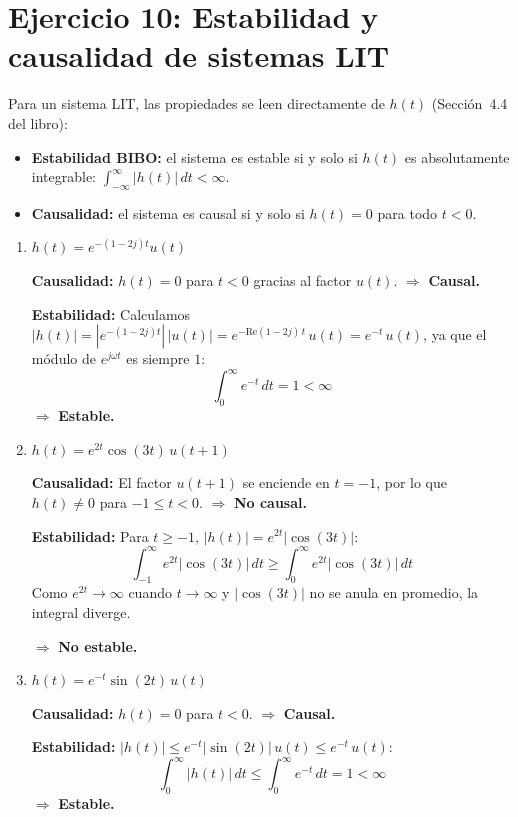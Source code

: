 \documentclass[10pt,a4paper]{article}
\begin{document}
	\section*{Ejercicio 10: Estabilidad y causalidad de sistemas LIT}
	
	Para un sistema LIT, las propiedades se leen directamente de $h(t)$ (Sección~4.4 del libro):
	\begin{itemize}
		\item \textbf{Estabilidad BIBO:} el sistema es estable si y solo si $h(t)$ es absolutamente integrable: $\int_{-\infty}^{\infty}|h(t)|\,dt < \infty$.
		\item \textbf{Causalidad:} el sistema es causal si y solo si $h(t) = 0$ para todo $t < 0$.
	\end{itemize}
	
	\begin{enumerate}[label=\textbf{\alph*)}]
		\item $h(t) = e^{-(1-2j)t}u(t)$
		
		\textbf{Causalidad:} $h(t) = 0$ para $t<0$ gracias al factor $u(t)$. $\Rightarrow$ \textbf{Causal.}
		
		\textbf{Estabilidad:} Calculamos $|h(t)| = |e^{-(1-2j)t}|\,|u(t)| = e^{-\text{Re}(1-2j)\,t}\,u(t) = e^{-t}\,u(t)$, ya que el módulo de $e^{j\omega t}$ es siempre $1$:
		\[
		\int_0^{\infty} e^{-t}\,dt = 1 < \infty
		\]
		$\Rightarrow$ \textbf{Estable.}
		
		\item $h(t) = e^{2t}\cos(3t)\,u(t+1)$
		
		\textbf{Causalidad:} El factor $u(t+1)$ se enciende en $t = -1$, por lo que $h(t) \neq 0$ para $-1 \leq t < 0$. $\Rightarrow$ \textbf{No causal.}
		
		\textbf{Estabilidad:} Para $t \geq -1$, $|h(t)| = e^{2t}|\cos(3t)|$:
		\[
		\int_{-1}^{\infty} e^{2t}|\cos(3t)|\,dt \geq \int_0^{\infty} e^{2t}|\cos(3t)|\,dt
		\]
		Como $e^{2t} \to \infty$ cuando $t \to \infty$ y $|\cos(3t)|$ no se anula en promedio, la integral diverge.
		
		$\Rightarrow$ \textbf{No estable.}
		
		\item $h(t) = e^{-t}\sin(2t)\,u(t)$
		
		\textbf{Causalidad:} $h(t) = 0$ para $t < 0$. $\Rightarrow$ \textbf{Causal.}
		
		\textbf{Estabilidad:} $|h(t)| \leq e^{-t}|\sin(2t)|\,u(t) \leq e^{-t}\,u(t)$:
		\[
		\int_0^{\infty} |h(t)|\,dt \leq \int_0^{\infty} e^{-t}\,dt = 1 < \infty
		\]
		$\Rightarrow$ \textbf{Estable.}
	\end{enumerate}
\end{document}
